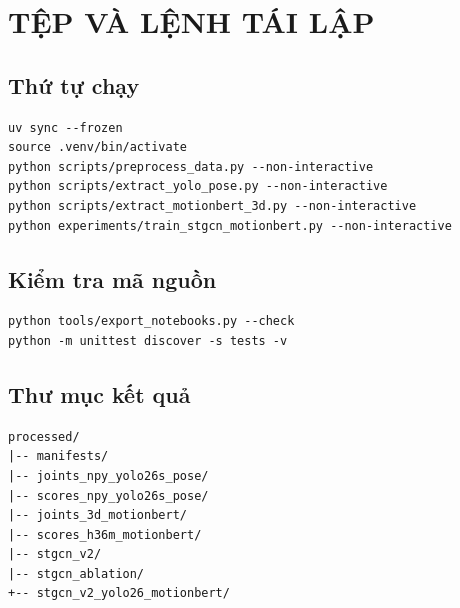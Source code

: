 \documentclass[12pt,a4paper,oneside]{report}
\begin{document}
\appendix
\chapter{TỆP VÀ LỆNH TÁI LẬP}

\section{Thứ tự chạy}
\begin{verbatim}
uv sync --frozen
source .venv/bin/activate
python scripts/preprocess_data.py --non-interactive
python scripts/extract_yolo_pose.py --non-interactive
python scripts/extract_motionbert_3d.py --non-interactive
python experiments/train_stgcn_motionbert.py --non-interactive
\end{verbatim}

\section{Kiểm tra mã nguồn}
\begin{verbatim}
python tools/export_notebooks.py --check
python -m unittest discover -s tests -v
\end{verbatim}

\section{Thư mục kết quả}
\begin{verbatim}
processed/
|-- manifests/
|-- joints_npy_yolo26s_pose/
|-- scores_npy_yolo26s_pose/
|-- joints_3d_motionbert/
|-- scores_h36m_motionbert/
|-- stgcn_v2/
|-- stgcn_ablation/
+-- stgcn_v2_yolo26_motionbert/
\end{verbatim}
\end{document}
